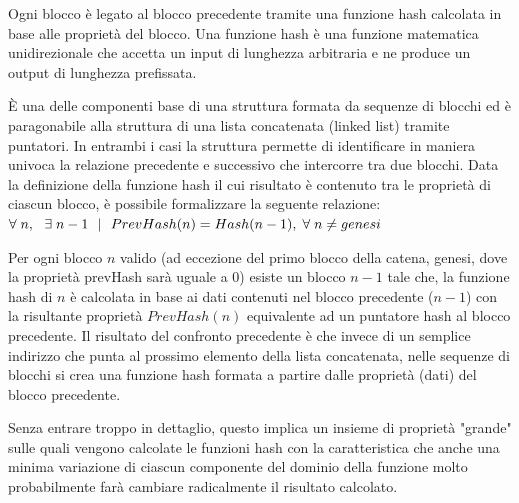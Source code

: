 Ogni blocco è legato al blocco precedente tramite una funzione hash calcolata in base alle proprietà del blocco. Una funzione hash è una funzione matematica unidirezionale che accetta un input di lunghezza arbitraria e ne produce un output di lunghezza prefissata.

È una delle componenti base di una struttura formata da sequenze di blocchi ed è paragonabile alla struttura di una lista concatenata (linked list) tramite puntatori. In entrambi i casi la struttura permette di identificare in maniera univoca la relazione precedente e successivo che intercorre tra due blocchi. Data la definizione della funzione hash il cui risultato è contenuto tra le proprietà di ciascun blocco, è possibile formalizzare la seguente relazione:
\\

\begin{math} 
\forall\; n,\ \ \exists\; n - 1 \ \ |  \ \ PrevHash(n) = Hash(n-1),\; \forall\; n \neq genesi
\\
\end{math}

Per ogni blocco \begin{math} n \end{math} valido (ad eccezione del primo blocco della catena, genesi, dove la proprietà prevHash sarà uguale a 0) esiste un blocco \begin{math} n-1 \end{math} tale che, la funzione hash di \begin{math} n \end{math} è calcolata in base ai dati contenuti nel blocco precedente (\begin{math} n-1 \end{math}) con la risultante proprietà \begin{math} PrevHash(n) \end{math} equivalente ad un puntatore hash al blocco precedente. 
Il risultato del confronto precedente è che invece di un semplice indirizzo che punta al prossimo elemento della lista concatenata, nelle sequenze di blocchi si crea una funzione hash formata a partire dalle proprietà (dati) del blocco precedente.

Senza entrare troppo in dettaglio, questo implica un insieme di proprietà "grande" sulle quali vengono calcolate le funzioni hash con la caratteristica che anche una minima variazione di ciascun componente del dominio della funzione molto probabilmente farà cambiare radicalmente il risultato calcolato.

